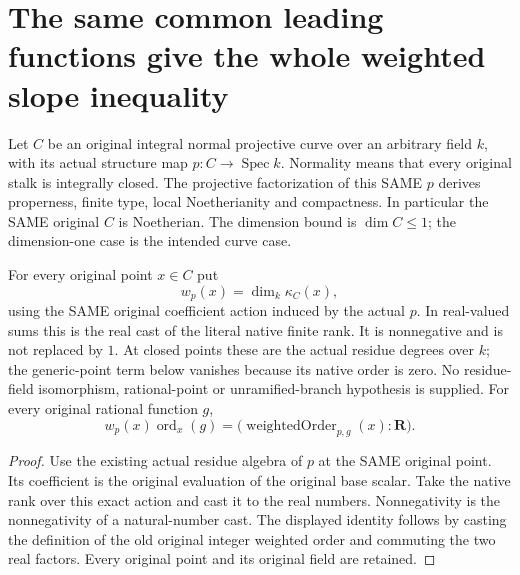 \section{The same common leading functions give the whole weighted slope inequality}

Let $C$ be an original integral normal projective curve over an arbitrary
field $k$, with its actual structure map $p:C\to\operatorname{Spec}k$.
Normality means that every original stalk is integrally closed. The
projective factorization of this SAME $p$ derives properness, finite type,
local Noetherianity and compactness. In particular the SAME original $C$
is Noetherian. The dimension bound is $\dim C\le1$; the dimension-one
case is the intended curve case.

\begin{definition}
\label{def:gauss-common-leading-original-residue-weight}
\leanok
For every original point $x\in C$ put
\[
 w_p(x)=\dim_k\kappa_C(x),
\]
using the SAME original coefficient action induced by the actual $p$.
In real-valued sums this is the real cast of the literal native finite
rank. It is nonnegative and is not replaced by $1$. At closed points
these are the actual residue degrees over $k$; the generic-point term
below vanishes because its native order is zero. No residue-field
isomorphism, rational-point or unramified-branch hypothesis is supplied.
For every original rational function $g$,
\[
 w_p(x)\operatorname{ord}_x(g)
   =\bigl(\operatorname{weightedOrder}_{p,g}(x):\mathbf R\bigr).
\]
\end{definition}
\begin{proof}
Use the existing actual residue algebra of $p$ at the SAME original
point. Its coefficient is the original evaluation of the original base
scalar. Take the native rank over this exact action and cast it to the
real numbers. Nonnegativity is the nonnegativity of a natural-number
cast. The displayed identity follows by casting the definition of the
old original integer weighted order and commuting the two real factors.
Every original point and its original field are retained.
\end{proof}

